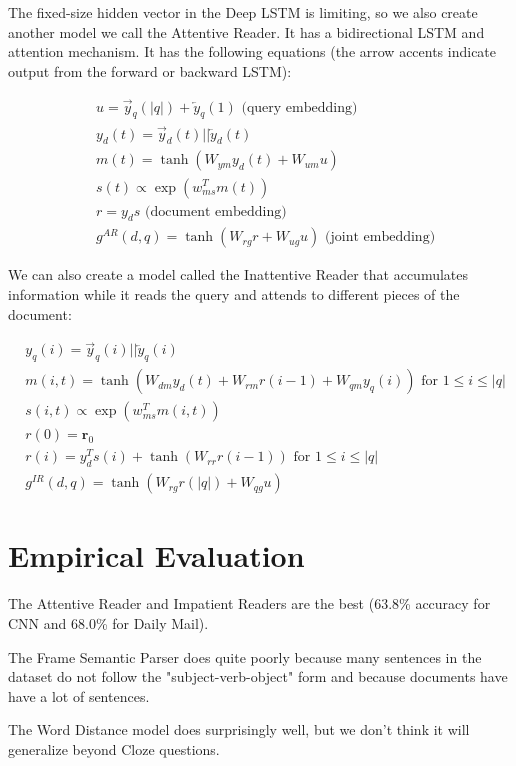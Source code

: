 \documentclass[a4paper]{article}
\begin{document}
The fixed-size hidden vector in the Deep LSTM is limiting, so we also create
another model we call the Attentive Reader. It has a bidirectional LSTM and
attention mechanism. It has the following equations (the arrow accents indicate
output from the forward or backward LSTM):

\begin{align}
  & u = \overrightarrow{y}_q(|q|) + \overleftarrow{y}_q(1) \text{ (query embedding)}\\
  & y_d(t) = \overrightarrow{y}_d(t) || \overleftarrow{y}_d(t) \\
  & m(t) = \tanh(W_{ym} y_d(t) + W_{um} u) \\
  & s(t) \propto \exp(w_{ms}^T m(t)) \\
  & r = y_d s \text{ (document embedding)}\\
  & g^{AR}(d, q) = \tanh(W_{rg} r + W_{ug} u) \text{ (joint embedding)}
\end{align}

We can also create a model called the Inattentive Reader that accumulates
information while it reads the query and attends to different pieces of
the document:

\begin{align}
  & y_q(i) = \overrightarrow{y}_q(i) || \overleftarrow{y}_q(i) \\
  & m(i, t) = \tanh(W_{dm} y_d(t) + W_{rm} r(i - 1) + W_{qm} y_q(i)) \text{ for $1 \leq i \leq |q|$} \\
  & s(i, t) \propto \exp(w_{ms}^T m(i, t)) \\
  & r(0) = \mathbf{r}_0 \\
  & r(i) = y_d^T s(i) + \tanh(W_{rr} r(i-1)) \text{ for $1 \leq i \leq |q|$} \\
  & g^{IR}(d, q) = \tanh(W_{rg} r(|q|) + W_{qg} u)
\end{align}

\section{Empirical Evaluation}
The Attentive Reader and Impatient Readers are the best (63.8\% accuracy for CNN
and 68.0\% for Daily Mail).

The Frame Semantic Parser does quite poorly because many sentences in the
dataset do not follow the "subject-verb-object" form and because documents have
have a lot of sentences.

The Word Distance model does surprisingly well, but we don't think it will
generalize beyond Cloze questions.
\end{document}
